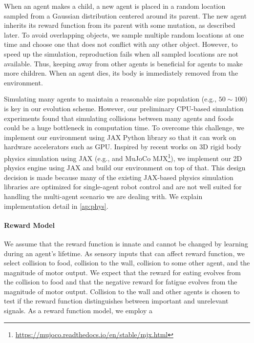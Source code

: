 When an agent makes a child, a new agent is placed in a random location sampled from a Gaussian distribution centered around its parent. The new agent inherits its reward function from its parent with some mutation, as described later. To avoid overlapping objects, we sample multiple random locations at one time and choose one that does not conflict with any other object. However, to speed up the simulation, reproduction fails when all sampled locations are not available. Thus, keeping away from other agents is beneficial for agents to make more children. When an agent dies, its body is immediately removed from the environment.

Simulating many agents to maintain a reasonable size population (e.g., $50\sim 100$) is key in our evolution scheme. However, our preliminary CPU-based simulation experiments found that simulating collisions between many agents and foods could be a huge bottleneck in computation time. To overcome this challenge, we implement our environment using JAX Python library \citep{jax2018github} so that it can work on hardware accelerators such as GPU. Inspired by recent works on 3D rigid body physics simulation using JAX (e.g., \citet{brax2021github} and MuJoCo \citep{todorov2012mujoco} MJX\footnote{\url{https://mujoco.readthedocs.io/en/stable/mjx.html}}), we implement our 2D physics engine using JAX and build our environment on top of that. This design decision is made because many of the existing JAX-based physics simulation libraries are optimized for single-agent robot control and are not well suited for handling the multi-agent scenario we are dealing with. We explain implementation detail in \cref{ap:phys}.

\paragraph{Reward Model}
We assume that the reward function is innate and cannot be changed by learning during an agent's lifetime. As sensory inputs that can affect reward function, we select  collision to food,  collision to the wall,  collision to some other agent, and  the magnitude of motor output. We expect that the reward for eating evolves from the collision to food and that the negative reward for fatigue evolves from the magnitude of motor output. Collision to the wall and other agents is chosen to test if the reward function distinguishes between important and unrelevant signals. As a reward function model, we employ a 


